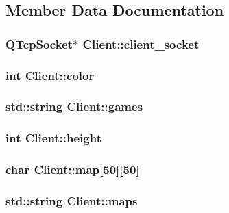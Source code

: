 \subsection{Member Data Documentation}
\hypertarget{classClient_aa684011b09c5d68ee677f026b036aaea}{
\subsubsection[{client\-\_\-socket}]{\setlength{\rightskip}{0pt plus 5cm}Q\-Tcp\-Socket$\ast$ Client\-::client\-\_\-socket\hspace{0.3cm}{\ttfamily [private]}}}\label{classClient_aa684011b09c5d68ee677f026b036aaea}
\hypertarget{classClient_ac6b50f30a11a753cabccc3f1fad83c82}{
\subsubsection[{color}]{\setlength{\rightskip}{0pt plus 5cm}int Client\-::color}}\label{classClient_ac6b50f30a11a753cabccc3f1fad83c82}
\hypertarget{classClient_aea5a7a7885c3bfd4dce194de2cef1003}{
\subsubsection[{games}]{\setlength{\rightskip}{0pt plus 5cm}std\-::string Client\-::games}}\label{classClient_aea5a7a7885c3bfd4dce194de2cef1003}
\hypertarget{classClient_af7d6fce6b2b35773b4222cd8e86a840a}{
\subsubsection[{height}]{\setlength{\rightskip}{0pt plus 5cm}int Client\-::height}}\label{classClient_af7d6fce6b2b35773b4222cd8e86a840a}
\hypertarget{classClient_a6fcbb886abc984b5a6d590367e84d3f6}{
\subsubsection[{map}]{\setlength{\rightskip}{0pt plus 5cm}char Client\-::map\mbox{[}50\mbox{]}\mbox{[}50\mbox{]}}}\label{classClient_a6fcbb886abc984b5a6d590367e84d3f6}
\hypertarget{classClient_a3ff1eaa556e62a485b2119d251d9d2d3}{
\subsubsection[{maps}]{\setlength{\rightskip}{0pt plus 5cm}std\-::string Client\-::maps}}\label{classClient_a3ff1eaa556e62a485b2119d251d9d2d3}
